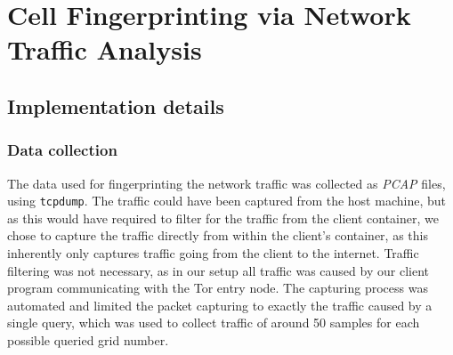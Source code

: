 \documentclass[9pt,conference]{IEEEtran}
\begin{document}
\section{Cell Fingerprinting via Network Traffic Analysis}
\label{sec:fingerprint}

\subsection{Implementation details}
\subsubsection{Data collection}
The data used for fingerprinting the network traffic was collected as \textit{PCAP} files, using \texttt{tcpdump}\cite{tcpdump}. The traffic could have been captured from the host machine, but as this would have required to filter for the traffic from the client container, we chose to capture the traffic directly from within the client's container, as this inherently only captures traffic going from the client to the internet. Traffic filtering was not necessary, as in our setup all traffic was caused by our client program communicating with the Tor entry node. The capturing process was automated and limited the packet capturing to exactly the traffic caused by a single query, which was used to collect traffic of around 50 samples for each possible queried grid number.
\end{document}
